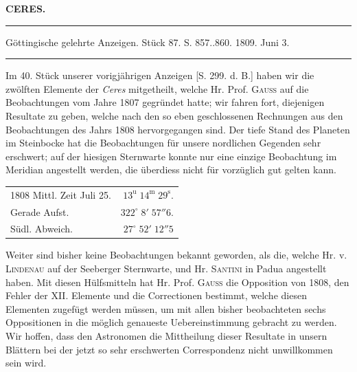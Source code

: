 \clearpage
{}
\hypertarget{native-317-lower}{}
\begin{center}
\textbf{CERES.}
\par\vspace{4pt}\hrule\vspace{4pt}
\fontsize{10}{12}\selectfont Göttingische gelehrte Anzeigen. Stück 87. S. 857..860. 1809. Juni 3.
\par\vspace{4pt}\hrule\vspace{4pt}
\end{center}

\par\indent Im 40. Stück unserer vorigjährigen Anzeigen [S. 299. d. B.] haben wir die zwölften Elemente der \emph{Ceres} mitgetheilt, welche Hr. Prof. \textsc{Gauss} auf die Beobachtungen vom Jahre 1807 gegründet hatte; wir fahren fort, diejenigen Resultate zu geben, welche nach den so eben geschlossenen Rechnungen aus den Beobachtungen des Jahrs 1808 hervorgegangen sind. Der tiefe Stand des Planeten im Steinbocke hat die Beobachtungen für unsere nordlichen Gegenden sehr erschwert; auf der hiesigen Sternwarte konnte nur eine einzige Beobachtung im Meridian angestellt werden, die überdiess nicht für vorzüglich gut gelten kann.


\begin{center}\fontsize{10}{12}\selectfont\setlength{\tabcolsep}{5pt}\renewcommand{\arraystretch}{1.15}\begin{tabular}{lr} 1808 Mittl. Zeit Juli 25. & $13^{\text{u}}\;14^{\text{m}}\;29^{\text{s}}$.\\ Gerade Aufst. & $322^\circ\;8'\;57''6$.\\ Südl. Abweich. & $27^\circ\;52'\;12''5$\\
\end{tabular}\end{center}


\par\indent Weiter sind bisher keine Beobachtungen bekannt geworden, als die, welche Hr. v. \textsc{Lindenau} auf der Seeberger Sternwarte, und Hr. \textsc{Santini} in Padua angestellt haben. Mit diesen Hülfsmitteln hat Hr. Prof. \textsc{Gauss} die Opposition von 1808, den Fehler der XII. Elemente und die Correctionen bestimmt, welche diesen Elementen zugefügt werden müssen, um mit allen bisher beobachteten sechs Oppositionen in die möglich genaueste Uebereinstimmung gebracht zu werden. Wir hoffen, dass den Astronomen die Mittheilung dieser Resultate in unsern Blättern bei der jetzt so sehr erschwerten Correspondenz nicht unwillkommen sein wird.

